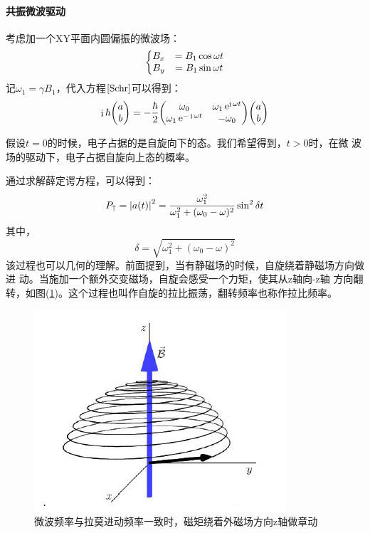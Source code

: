 \documentclass[a4paper]{article}
\DeclareMathOperator{\e}{\mathrm{e}}
\DeclareMathOperator{\I}{\mathrm{i}}
\begin{document}
\paragraph{共振微波驱动}
考虑加一个XY平面内圆偏振的微波场：
\begin{equation}\label{key}
\left\{
\mqty{B_x &= B_1\cos\omega t\\
	  B_y &= B_1\sin\omega t}\right.
\end{equation}
记$ \omega_1 = \gamma B_1 $，代入方程$ \eqref{Schr} $可以得到：
\begin{equation}\label{key}
\I\hbar \mqty(a\\ b) = -\dfrac{\hbar}{2}
\mqty(\omega_0 & \omega_1\e^{\I\omega t}\\ \omega_1\e^{-\I\omega t} & -\omega_0) \mqty(a \\ b)
\end{equation}

假设$ t = 0  $的时候，电子占据的是自旋向下的态。我们希望得到，$ t > 0  $时，在微
波场的驱动下，电子占据自旋向上态的概率。%

通过求解薛定谔方程，可以得到：
\begin{equation}\label{key}
P_\uparrow = \abs{a(t)}^2 = \dfrac{\omega_1^2}{\omega_1^2 + (\omega_0 - \omega)^2}\sin^2\delta t
\end{equation}
其中，
\begin{equation}\label{key}
\delta = \sqrt{\omega_1^2 + (\omega_0 - \omega)^2}
\end{equation}
该过程也可以几何的理解。前面提到，当有静磁场的时候，自旋绕着静磁场方向做进
动。当施加一个额外交变磁场，自旋会感受一个力矩，使其从z轴向-z轴
方向翻转，如图(\ref{fig:larmor2})。这个过程也叫作自旋的拉比振荡，翻转频率也称作拉比频率。
\begin{figure}[H]
	\centering
	\includegraphics[width=0.5\linewidth]{fig/larmor2.jpg}
	\caption{微波频率与拉莫进动频率一致时，磁矩绕着外磁场方向z轴做章动}
	\label{fig:larmor2}
\end{figure}
\end{document}
